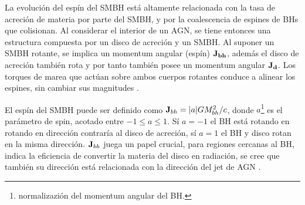 La evolución del espín del SMBH está altamente relacionada con la tasa de acreción de materia por parte del SMBH\cite{king2005}, y por la coalescencia de espines de BHs que colisionan\cite{dubois2014}. Al considerar el interior de un AGN, se tiene entonces una estructura compuesta por un disco de acreción y un SMBH. Al suponer un SMBH rotante, se implica un momentum angular (espín) $\bf{J}_{bh}$, además el disco de acreción también rota y por tanto también posee un momentum angular $\bf{J}_{d}$. Los torques de marea que actúan sobre ambos cuerpos rotantes conduce a alinear los espines, sin cambiar sus magnitudes \cite{king2005}.

El espín del SMBH puede ser definido como ${\bf{J}}_{bh}=|a|GM^{2}_{bh}/c$, donde $a$\footnote{normalizazión del momentum angular del BH.} es el parámetro de spin, acotado entre $-1\leq a \leq 1$. Sí $a=-1$ el BH está rotando en rotando en dirección contraría al disco de acreción, sí $a=1$ el BH y disco rotan en la misma dirección. ${\bf{J}}_{bh}$ juega un papel crucial, para regiones cercanas al BH, indica la eficiencia de convertir la materia del disco en radiación, se cree que también su dirección está relacionada con la dirección del jet de AGN \cite{fanidakis2011}. 

